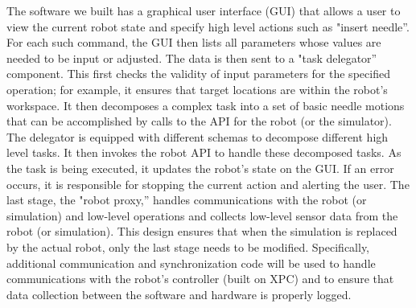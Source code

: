 The software we built has a graphical user interface (GUI) that allows a user to view the current robot state and specify high level actions such as "insert needle''. For each such command, the GUI then lists all parameters whose values are needed to be input or adjusted. The data is then sent to a "task delegator'' component. This first checks the validity of input parameters for the specified operation; for example, it ensures that target locations are within the robot’s workspace. It then decomposes a complex task into a set of basic needle motions that can be accomplished by calls to the API for the robot (or the simulator). The delegator is equipped with different schemas to decompose different high level tasks. It then invokes the robot API to handle these decomposed tasks. As the task is being executed, it updates the robot’s state on the GUI. If an error occurs, it is responsible for stopping the current action and alerting the user. The last stage, the "robot proxy,'' handles communications with the robot (or simulation) and low-level operations and collects low-level sensor data from the robot (or simulation). This design ensures that when the simulation is replaced by the actual robot, only the last stage needs to be modified. Specifically, additional communication and synchronization code will be used to handle communications with the robot’s controller (built on XPC) and to ensure that data collection between the software and hardware is properly logged.

